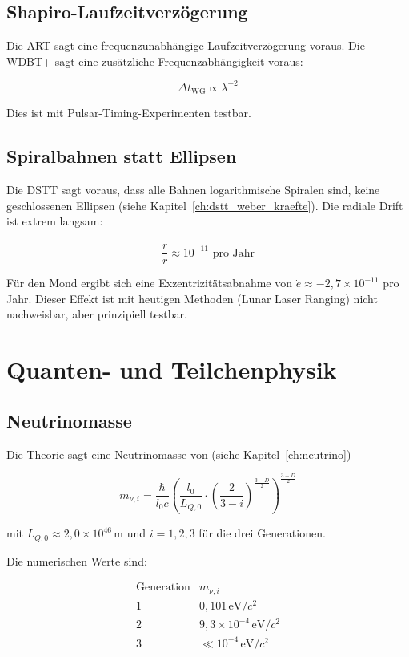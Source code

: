 \subsection{Shapiro-Laufzeitverzögerung}
\label{sub:vorh_shapiro}

Die ART sagt eine frequenzunabhängige Laufzeitverzögerung voraus. Die WDBT+ sagt eine zusätzliche Frequenzabhängigkeit voraus:

\[
\Delta t_{\text{WG}} \propto \lambda^{-2}
\]

Dies ist mit Pulsar-Timing-Experimenten testbar.

\subsection{Spiralbahnen statt Ellipsen}
\label{sub:vorh_spiralbahnen}

Die DSTT sagt voraus, dass alle Bahnen logarithmische Spiralen sind, keine geschlossenen Ellipsen (siehe Kapitel~\ref{ch:dstt_weber_kraefte}). Die radiale Drift ist extrem langsam:

\[
\frac{\dot{r}}{r} \approx 10^{-11} \text{ pro Jahr}
\]

Für den Mond ergibt sich eine Exzentrizitätsabnahme von \( \dot{e} \approx -2,7 \times 10^{-11} \) pro Jahr. Dieser Effekt ist mit heutigen Methoden (Lunar Laser Ranging) nicht nachweisbar, aber prinzipiell testbar.

\section{Quanten- und Teilchenphysik}
\label{sec:vorh_quanten}

\subsection{Neutrinomasse}
\label{sub:vorh_neutrinomasse}

Die Theorie sagt eine Neutrinomasse von (siehe Kapitel~\ref{ch:neutrino})

\[
m_{\nu,i} = \frac{\hbar}{l_0 c} \left( \frac{l_0}{L_{Q,0}} \cdot \left(\frac{2}{3-i}\right)^{\frac{3-D}{2}} \right)^{\frac{3-D}{2}}
\]

mit \( L_{Q,0} \approx 2{,}0 \times 10^{46} \, \text{m} \) und \( i = 1,2,3 \) für die drei Generationen.

Die numerischen Werte sind:

\[
\begin{array}{c|c}
\text{Generation} & m_{\nu,i} \\
\hline
1 & 0,101 \, \text{eV}/c^2 \\
2 & 9,3 \times 10^{-4} \, \text{eV}/c^2 \\
3 & \ll 10^{-4} \, \text{eV}/c^2
\end{array}
\]

